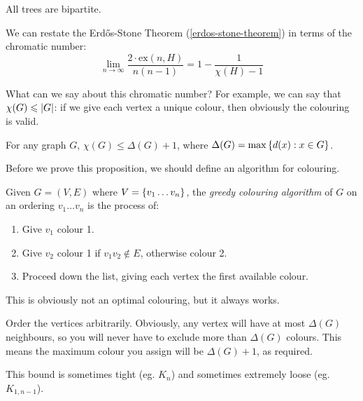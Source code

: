 \documentclass{article}
\begin{document}
\begin{corollary}
    All trees are bipartite.
\end{corollary}

\begin{corollary}
    We can restate the Erd{\H o}s-Stone Theorem (\ref{erdos-stone-theorem}) in terms of the chromatic number:
	\[
	\lim_{n \to \infty} \frac{2 \cdot \mathrm{ex}(n, H)}{n(n-1)} = 1 - \frac{1}{\chi(H)-1}
	\]
\end{corollary}

What can we say about this chromatic number? For example, we can say that $\chi(G) \leqslant \left\lvert G \right\rvert$: if we give each vertex a unique colour, then obviously the colouring is valid.

\begin{proposition}
    \label{bound-on-chi}
    For any graph $G$, $\chi(G) \leq \Delta(G) + 1$, where $\Delta(G) = \max \left\lbrace d(x) : x \in G \right\rbrace$.
\end{proposition}

Before we prove this proposition, we should define an algorithm for colouring.

\begin{definition}
    Given $G = (V, E)$ where $V = \left\lbrace v_1 \dots v_n \right\rbrace$, the \textit{greedy colouring algorithm} of $G$ on an ordering $v_1 \dots v_n$ is the process of:
    \begin{enumerate}
    \item Give $v_1$ colour 1.
    \item Give $v_2$ colour 1 if $v_1 v_2 \notin E$, otherwise colour 2.
    \item Proceed down the list, giving each vertex the first available colour.
	\end{enumerate}
	This is obviously not an optimal colouring, but it always works.
\end{definition}

\begin{prf}
    Order the vertices arbitrarily. Obviously, any vertex will have at most $\Delta(G)$ neighbours, so you will never have to exclude more than $\Delta(G)$ colours. This means the maximum colour you assign will be $\Delta(G) + 1$, as required.
\end{prf}

\begin{note}
	This bound is sometimes tight (eg. $K_n$) and sometimes extremely loose (eg. $K_{1,n-1}$).
\end{note}
\end{document}
